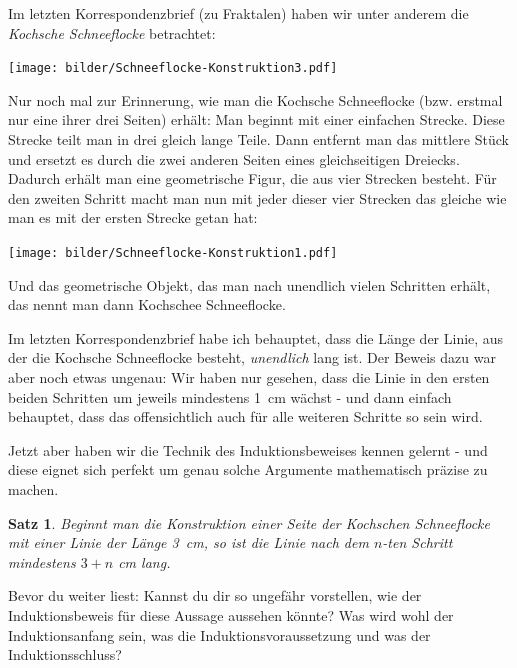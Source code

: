 \documentclass[a4paper,ngerman,12pt]{scrartcl}
\theoremstyle{definition}
\theoremstyle{plain}
\newtheorem{satz}[defn]{Satz}
\theoremstyle{remark}
\begin{document}
Im letzten Korrespondenzbrief (zu Fraktalen) haben wir unter anderem die \emph{Kochsche Schneeflocke} betrachtet:
\begin{center}
	\texttt{[image: bilder/Schneeflocke-Konstruktion3.pdf]}
\end{center}
Nur noch mal zur Erinnerung, wie man die Kochsche Schneeflocke (bzw. erstmal nur eine ihrer drei Seiten) erhält: Man beginnt mit einer einfachen Strecke. Diese Strecke teilt man in drei gleich lange Teile. Dann entfernt man das mittlere Stück und ersetzt es durch die zwei anderen Seiten eines gleichseitigen Dreiecks. Dadurch erhält man eine geometrische Figur, die aus vier Strecken besteht. Für den zweiten Schritt macht man nun mit jeder dieser vier Strecken das gleiche wie man es mit der ersten Strecke getan hat:
\begin{center}
	\texttt{[image: bilder/Schneeflocke-Konstruktion1.pdf]}
\end{center}
Und das geometrische Objekt, das man \glqq nach unendlich vielen Schritten\grqq{} erhält, das nennt man dann Kochschee Schneeflocke.

Im letzten Korrespondenzbrief habe ich behauptet, dass die Länge der Linie, aus der die Kochsche Schneeflocke besteht, \emph{unendlich} lang ist. Der Beweis dazu war aber noch etwas ungenau: Wir haben nur gesehen, dass die Linie in den ersten beiden Schritten um jeweils mindestens \SI{1}{\cm} wächst - und dann einfach behauptet, dass das \glqq offensichtlich\grqq{} auch für alle weiteren Schritte so sein wird.

Jetzt aber haben wir die Technik des Induktionsbeweises kennen gelernt - und diese eignet sich perfekt um genau solche Argumente mathematisch präzise zu machen. 

\begin{satz}
	Beginnt man die Konstruktion einer Seite der Kochschen Schneeflocke mit einer Linie der Länge \SI{3}{\cm}, so ist die Linie nach dem $n$-ten Schritt mindestens $3+n$ \si{\cm} lang.
\end{satz}

Bevor du weiter liest: Kannst du dir so ungefähr vorstellen, wie der Induktionsbeweis für diese Aussage aussehen könnte? Was wird wohl der Induktionsanfang sein, was die Induktionsvoraussetzung und was der Induktionsschluss?
\end{document}
